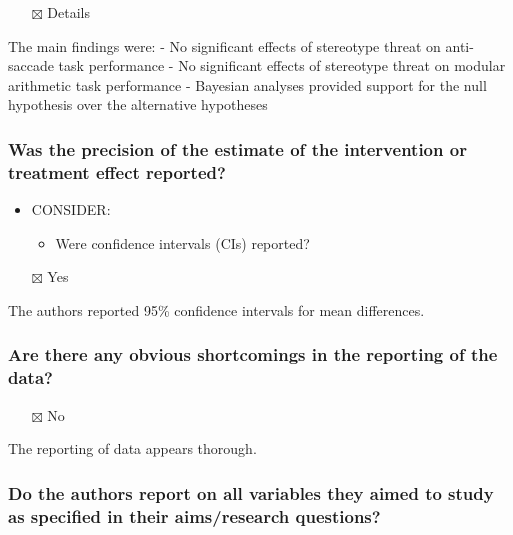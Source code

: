 \documentclass[
  doc, a4paper]{apa7}
\providecommand{\tightlist}{%
  \setlength{\itemsep}{0pt}\setlength{\parskip}{0pt}}
\begin{document}
\begin{itemize}
\tightlist
\item[$\boxtimes$]
  Details
\end{itemize}

The main findings were:
- No significant effects of stereotype threat on anti-saccade task performance
- No significant effects of stereotype threat on modular arithmetic task performance
- Bayesian analyses provided support for the null hypothesis over the alternative hypotheses

\subsubsection{Was the precision of the estimate of the intervention or treatment effect reported?}\label{was-the-precision-of-the-estimate-of-the-intervention-or-treatment-effect-reported}

\begin{itemize}
\tightlist
\item
  CONSIDER:

  \begin{itemize}
  \tightlist
  \item
    Were confidence intervals (CIs) reported?
  \end{itemize}
\item[$\boxtimes$]
  Yes
\end{itemize}

The authors reported 95\% confidence intervals for mean differences.

\subsubsection{Are there any obvious shortcomings in the reporting of the data?}\label{are-there-any-obvious-shortcomings-in-the-reporting-of-the-data}

\begin{itemize}
\tightlist
\item[$\boxtimes$]
  No
\end{itemize}

The reporting of data appears thorough.

\subsubsection{Do the authors report on all variables they aimed to study as specified in their aims/research questions?}\label{do-the-authors-report-on-all-variables-they-aimed-to-study-as-specified-in-their-aimsresearch-questions}
\end{document}
